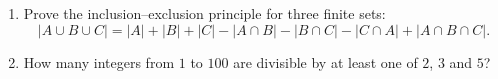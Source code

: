 \begin{enumerate}
\item[(a)] Prove the inclusion--exclusion principle for three finite sets:
\[|A\cup B\cup C|=|A|+|B|+|C|-|A\cap B|-|B\cap C|-|C\cap A|+|A\cap B\cap C|.\]
\item[(b)] How many integers from $1$ to $100$ are divisible by at least one of $2$, $3$ and $5$?
\end{enumerate}

